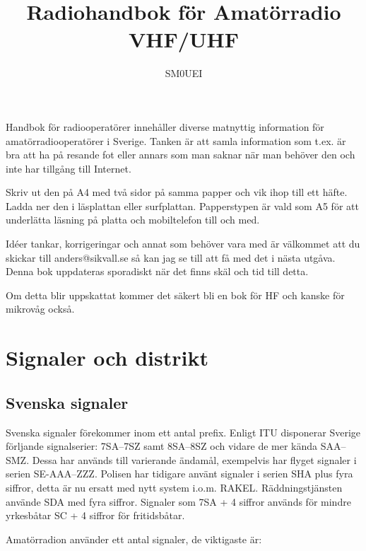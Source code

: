 
\title{Radiohandbok för Amatörradio\\
VHF/UHF}
\author{SM0UEI}
\maketitle

Handbok för radiooperatörer innehåller diverse matnyttig information för ama\-tör\-radio\-oper\-atör\-er i Sverige. Tanken är att samla information som t.ex. är bra att ha på resande fot eller annars som man saknar när man behöver den och inte har tillgång till Internet.

Skriv ut den på A4 med två sidor på samma papper och vik ihop till ett häfte. Ladda ner den i läsplattan eller surfplattan. Papperstypen är vald som A5 för att underlätta läsning på platta och mobiltelefon till och med.

Idéer tankar, korrigeringar och annat som behöver vara med är väl\-kom\-met att du skickar till anders@sikvall.se så kan jag se till att få med det i nästa utgåva. Denna bok uppdateras sporadiskt när det finns skäl och tid till detta.

Om detta blir uppskattat kommer det säkert bli en bok för HF och kanske för mikrovåg också.

\clearpage
\tableofcontents
\clearpage

\setlength{\parskip}{0.5em}
\setlength{\parindent}{0pt}


\section{Signaler och distrikt}

\subsection{Svenska signaler}

Svenska signaler förekommer inom ett antal prefix. Enligt ITU disponerar Sverige förljande signalserier:
7SA--7SZ samt 8SA--8SZ och vidare de mer kända SAA--SMZ. Dessa har används till varierande ändamål, exempelvis har flyget signaler i serien SE-AAA--ZZZ. Polisen har tidigare använt signaler i serien SHA plus fyra siffror, detta är nu ersatt med nytt system i.o.m. RAKEL. Räddningstjänsten använde SDA med fyra siffror. Signaler som 7SA + 4 siffror används för mindre yrkesbåtar SC + 4 siffror för fritidsbåtar.

Amatörradion använder ett antal signaler, de viktigaste är:

